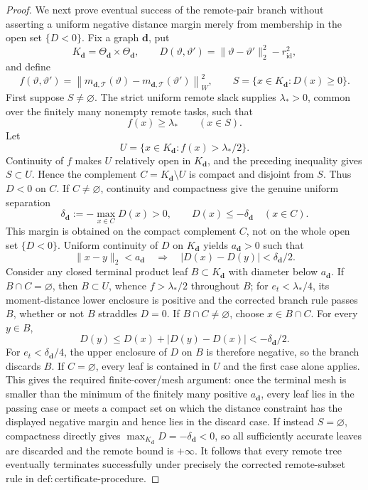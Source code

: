 \documentclass{article}
\begin{document}
\begin{proof}
We next prove eventual success of the remote-pair branch without asserting a uniform negative distance margin merely from membership in the open set \(\{D<0\}\).  Fix a graph \(\boldsymbol d\), put
\[
 K_{\boldsymbol d}=\Theta_{\boldsymbol d}\times\Theta_{\boldsymbol d},
 \qquad
 D(\vartheta,\vartheta')=\lVert\vartheta-\vartheta'\rVert_2^2-r_{\mathrm{id}}^2,
\]
and define
\[
 f(\vartheta,\vartheta')=
 \left\lVert m_{\boldsymbol d,\mathcal T}(\vartheta)
              -m_{\boldsymbol d,\mathcal T}(\vartheta')\right\rVert_W^2,
 \qquad
 S=\{x\in K_{\boldsymbol d}:D(x)\geq0\}.
\]
First suppose \(S\neq\varnothing\).  The strict uniform remote slack supplies \(\lambda_*>0\), common over the finitely many nonempty remote tasks, such that
\[
 f(x)\geq\lambda_*\qquad(x\in S).
\]
Let
\[
 U=\{x\in K_{\boldsymbol d}:f(x)>\lambda_*/2\}.
\]
Continuity of \(f\) makes \(U\) relatively open in \(K_{\boldsymbol d}\), and the preceding inequality gives \(S\subset U\).  Hence the complement \(C=K_{\boldsymbol d}\setminus U\) is compact and disjoint from \(S\).  Thus \(D<0\) on \(C\).  If \(C\neq\varnothing\), continuity and compactness give the genuine uniform separation
\[
 \delta_{\boldsymbol d}:=-\max_{x\in C}D(x)>0,
 \qquad D(x)\leq-\delta_{\boldsymbol d}\quad(x\in C).
\]
This margin is obtained on the compact complement \(C\), not on the whole open set \(\{D<0\}\).  Uniform continuity of \(D\) on \(K_{\boldsymbol d}\) yields \(a_{\boldsymbol d}>0\) such that
\[
 \lVert x-y\rVert_2<a_{\boldsymbol d}
 \quad\Longrightarrow\quad
 |D(x)-D(y)|<\delta_{\boldsymbol d}/2.
\]
Consider any closed terminal product leaf \(B\subset K_{\boldsymbol d}\) with diameter below \(a_{\boldsymbol d}\).  If \(B\cap C=\varnothing\), then \(B\subset U\), whence \(f>\lambda_*/2\) throughout \(B\); for \(e_t<\lambda_*/4\), its moment-distance lower enclosure is positive and the corrected branch rule passes \(B\), whether or not \(B\) straddles \(D=0\).  If \(B\cap C\neq\varnothing\), choose \(x\in B\cap C\).  For every \(y\in B\),
\[
 D(y)\leq D(x)+|D(y)-D(x)|
 <-\delta_{\boldsymbol d}/2.
\]
For \(e_t<\delta_{\boldsymbol d}/4\), the upper enclosure of \(D\) on \(B\) is therefore negative, so the branch discards \(B\).  If \(C=\varnothing\), every leaf is contained in \(U\) and the first case alone applies.  This gives the required finite-cover/mesh argument: once the terminal mesh is smaller than the minimum of the finitely many positive \(a_{\boldsymbol d}\), every leaf lies in the passing case or meets a compact set on which the distance constraint has the displayed negative margin and hence lies in the discard case.  If instead \(S=\varnothing\), compactness directly gives \(\max_{K_{\boldsymbol d}}D=-\delta_{\boldsymbol d}<0\), so all sufficiently accurate leaves are discarded and the remote bound is \(+\infty\).  It follows that every remote tree eventually terminates successfully under precisely the corrected remote-subset rule in \(\mathrm{def{:}certificate\text{-}procedure}\).


\end{proof}
\end{document}
